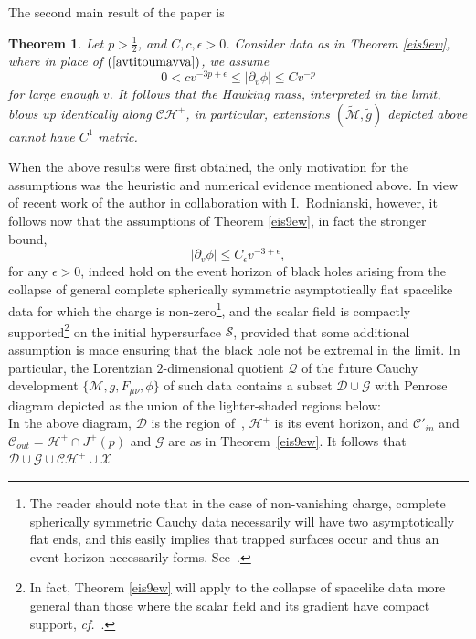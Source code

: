 \documentclass{article}
\newtheorem{theorem}{Theorem}[section]
\begin{document}
The second main result of the paper is 
\begin{theorem}
\label{allo9ewr}
Let $p>\frac12$, and $C,c,\epsilon>0$.
Consider data as in Theorem \ref{eis9ew}, where
in place of $(\ref{avtitoumavva})$, we assume
\[
0<cv^{-3p+\epsilon}\le|\partial_v\phi|\le Cv^{-p}
\]
for large enough $v$.
It follows that the Hawking mass, interpreted in the limit, blows up identically
along $\mathcal{CH}^+$,
in particular, extensions $(\tilde{\mathcal{M}},\tilde{g})$
depicted above
\emph{cannot} have $C^1$ metric.
\end{theorem}

When the above results were first obtained, the only motivation
for the assumptions was the heuristic and numerical evidence
mentioned above.
In view of recent work \cite{mi:mazi} of the author in collaboration
with I.~Rodnianski, however, it follows now that
the assumptions of Theorem \ref{eis9ew},
in fact the stronger bound, 
\begin{equation}
\label{pioduvato}
|\partial_v\phi|\le C_\epsilon v^{-3+\epsilon},
\end{equation}
for any $\epsilon>0$,
indeed hold on the event horizon of black holes arising
from the collapse of general complete spherically symmetric asymptotically flat
spacelike data
for which the charge is non-zero\footnote{The reader should note that in the case
of non-vanishing charge, complete 
spherically symmetric Cauchy data necessarily will have two
asymptotically flat ends, and this easily implies
that trapped surfaces occur and thus
an event horizon necessarily forms. See~\cite{md:sssts}.}, and
the scalar field is compactly supported\footnote{In fact, Theorem \ref{eis9ew}
 will apply to
the collapse of spacelike data more general than
those where the scalar field and its gradient have
compact support, \emph{cf.}~\cite{lb:nc}.} on the
initial hypersurface 
$\mathcal{S}$, provided that some additional assumption
is made ensuring that the black hole not be extremal in the 
limit.
In particular, the Lorentzian $2$-dimensional quotient $\mathcal{Q}$
of the future Cauchy development $\{\mathcal{M}, g, F_{\mu\nu}, \phi\}$
of such data contains
a subset $\mathcal{D}\cup\mathcal{G}$ with Penrose diagram depicted as the union of
the lighter-shaded regions below:
\[

\]
In the above diagram, $\mathcal{D}$ is the region of~\cite{mi:mazi},
$\mathcal{H}^+$ is its event horizon,
and $\mathcal{C}'_{in}$ and $\mathcal{C}_{out}=\mathcal{H}^+\cap J^+(p)$ and
$\mathcal{G}$ are as in Theorem~\ref{eis9ew}.
It follows
that $\mathcal{D}\cup\mathcal{G}\cup\mathcal{CH}^+\cup\mathcal{X}$
\end{document}
